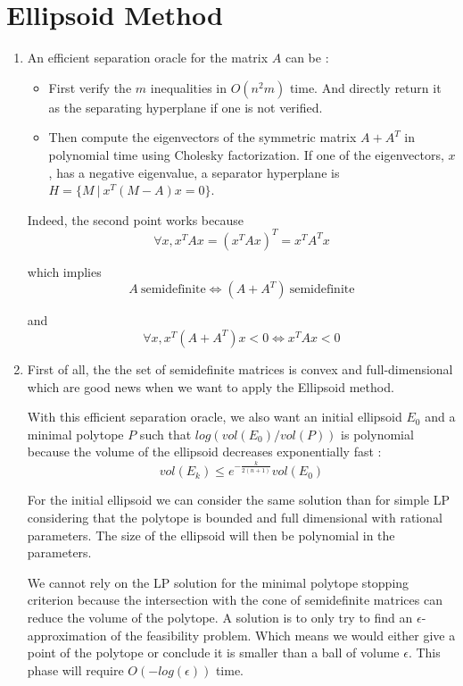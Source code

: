 \documentclass{scrartcl}
\newcommand\1{\mathbf{1}}
\begin{document}
\section{Ellipsoid Method}
\begin{enumerate}
\item
An efficient separation oracle for the matrix $A$ can be :
\begin{itemize}
\item First verify the $m$ inequalities in $O(n^2m)$ time. And directly return it as the separating hyperplane if one is not verified.

\item Then compute the eigenvectors of the symmetric matrix $A + A^T$ in polynomial time using Cholesky factorization. If one of the eigenvectors, $x$, has a negative eigenvalue, a separator hyperplane is $H = \{M\ |\ x^T (M-A) x = 0\}$.
\end{itemize}

Indeed, the second point works because
\[
\forall x, x^T A x = (x^T A x)^T = x^T A^T x
\]

which implies
\[
A \ \text{semidefinite} \iff (A + A^T)\ \text{semidefinite}
\]

and
\[
\forall x, x^T (A + A^T) x < 0 \iff x^T A x < 0
\]

\item
First of all, the the set of semidefinite matrices is convex and full-dimensional which are good news when we want to apply the Ellipsoid method.

With this efficient separation oracle, we also want an initial ellipsoid $E_0$ and a minimal polytope $P$ such that $log(vol(E_0)/vol(P))$ 
is polynomial because the volume of the ellipsoid decreases exponentially fast :
\[
vol(E_k)\le e^{-\frac{k}{2(n+1)}} vol(E_0)
\]

For the initial ellipsoid we can consider the same solution than for simple LP considering that the polytope is bounded and full dimensional with rational parameters. The size of the ellipsoid will then be polynomial in the parameters. 

We cannot rely on the LP solution for the minimal polytope stopping criterion because the intersection with the cone of semidefinite matrices can reduce the volume of the polytope. A solution is to only try to find an $\epsilon$-approximation of the feasibility problem. Which means we would either give a point of the polytope or conclude it is smaller than a ball of volume $\epsilon$. This phase will require $O(-log(\epsilon))$ time.




\end{enumerate}
\end{document}

